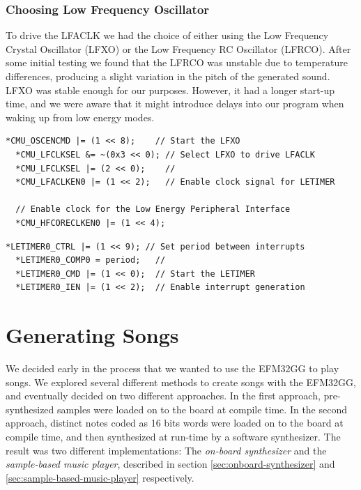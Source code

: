 \subsubsection{Choosing Low Frequency Oscillator}
To drive the LFACLK we had the choice of either using the Low Frequency Crystal Oscillator (LFXO) or the Low Frequency RC Oscillator (LFRCO). After some initial testing we found that the LFRCO was unstable due to temperature differences, producing a slight variation in the pitch of the generated sound. LFXO was stable enough for our purposes. However, it had a longer start-up time, and we were aware that it might introduce delays into our program when waking up from low energy modes. \cite{efm32-oscillator-design-considerations-application-note} \\
 
\noindent\begin{minipage}[c]{\textwidth}
  \begin{lstlisting}[caption=Setting up the LFACLK to drive the LETIMER ,label={lst:lfaclk-setup}]
  *CMU_OSCENCMD |= (1 << 8);    // Start the LFXO
  *CMU_LFCLKSEL &= ~(0x3 << 0); // Select LFXO to drive LFACLK
  *CMU_LFCLKSEL |= (2 << 0);    //
  *CMU_LFACLKEN0 |= (1 << 2);   // Enable clock signal for LETIMER 

  // Enable clock for the Low Energy Peripheral Interface
  *CMU_HFCORECLKEN0 |= (1 << 4);
  \end{lstlisting}
\end{minipage}

\noindent\begin{minipage}[c]{\textwidth}
  \begin{lstlisting}[caption=Setting up LETIMER to generate periodic interrupts,label={lst:letimer-setup}]
  *LETIMER0_CTRL |= (1 << 9); // Set period between interrupts
  *LETIMER0_COMP0 = period;   // 
  *LETIMER0_CMD |= (1 << 0);  // Start the LETIMER
  *LETIMER0_IEN |= (1 << 2);  // Enable interrupt generation
  \end{lstlisting}
\end{minipage}


\section{Generating Songs}
We decided early in the process that we wanted to use the EFM32GG to play songs. We explored several different methods to create songs with the EFM32GG, and eventually decided on two different approaches. In the first approach, pre-synthesized samples were loaded on to the board at compile time. In the second approach, distinct notes coded as 16 bits words were loaded on to the board at compile time, and then synthesized at run-time by a software synthesizer. The result was two different implementations: The \emph{on-board synthesizer} and the \emph{sample-based music player}, described in section \ref{sec:onboard-synthesizer} and \ref{sec:sample-based-music-player} respectively.

